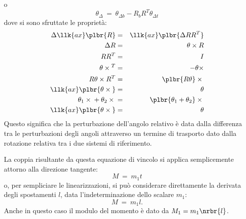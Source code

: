 \documentclass[12pt,dvips,fleqn,italian]{article}
\begin{document}
o
\begin{displaymath}
	\theta_{\Delta} \ = \ \theta_{\Delta{b}}-R_bR^T\theta_{\Delta{t}}
\end{displaymath}
dove si sono sfruttate le propriet\`a:
\begin{eqnarray*}
	\Delta\llk{ax}\plbr{R} & = & \llk{ax}\plbr{\Delta{R} R^T} \\
	\Delta{R} & = & \theta\times{R} \\
	R R^T & = & I \\
	\theta\times{}^T & = & -\theta\times \\
	R \theta\times{R^T} & = & \plbr{R\theta}\times{} \\
	\llk{ax}\plbr{\theta\times{}} & = & \theta \\
	\theta_1\times{}+\theta_2\times{} & = & \plbr{\theta_1+\theta_2}\times{} \\
	\llk{ax}\plbr{\theta\times{}} & = & \theta
\end{eqnarray*}
Questo significa che la perturbazione dell'angolo relativo \`e data 
dalla differenza tra le perturbazioni degli angoli attraverso un termine 
di trasporto dato dalla rotazione relativa tra i due sistemi di riferimento.

\noindent
La coppia risultante da questa equazione di vincolo si applica semplicemente
attorno alla direzione tangente:
\begin{displaymath}
	M \ = \ m_1 t
\end{displaymath}
o, per sempliciare le linearizzazioni, si pu\`o considerare direttamente
la derivata degli spostamenti $l$, data l'indeterminazione dello scalare
$m_1$:
\begin{displaymath}
	M \ = \ m_1 l .
\end{displaymath}
Anche in questo caso il modulo del momento \`e dato da $M_1=m_1\nrbr{l}$.
\end{document}
